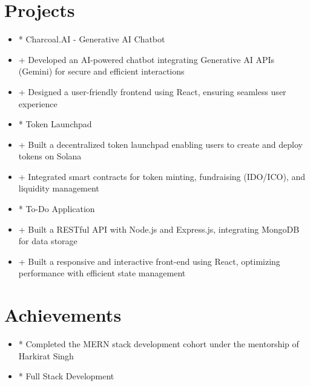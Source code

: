 \documentclass[10pt]{article}
\begin{document}
\section*{Projects}
\begin{itemize}[leftmargin=*]

  \item * Charcoal.AI - Generative AI Chatbot

  \item + Developed an AI-powered chatbot integrating Generative AI APIs (Gemini) for secure and efficient interactions

  \item + Designed a user-friendly frontend using React, ensuring seamless user experience

  \item * Token Launchpad

  \item + Built a decentralized token launchpad enabling users to create and deploy tokens on Solana

  \item + Integrated smart contracts for token minting, fundraising (IDO/ICO), and liquidity management

  \item * To-Do Application

  \item + Built a RESTful API with Node.js and Express.js, integrating MongoDB for data storage

  \item + Built a responsive and interactive front-end using React, optimizing performance with efficient state management

\end{itemize}





\section*{Achievements}
\begin{itemize}[leftmargin=*]

  \item * Completed the MERN stack development cohort under the mentorship of Harkirat Singh

  \item * Full Stack Development

\end{itemize}
\end{document}
